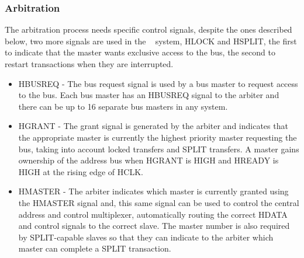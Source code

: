  
 \subsubsection{Arbitration}
 
 The arbitration process needs specific control signals, despite the ones described below, two more signals are used in the \amba~ system, HLOCK and HSPLIT,  the first to indicate that the master wants exclusive access to the bus, the second to restart transactions when they are interrupted.
 
 \begin{itemize}

\item  {HBUSREQ - } The bus request signal is used by a bus master to request access to the bus. Each bus master has an HBUSREQ signal to the arbiter and there can be up to 16 separate bus masters in any system.


\item  {HGRANT - } The grant signal is generated by the arbiter and indicates that the appropriate master is currently the highest priority master requesting the bus, taking into account locked transfers and SPLIT transfers. A master gains ownership of the address bus when HGRANT is HIGH and HREADY is HIGH at the rising edge of HCLK.

\item  {HMASTER - } The arbiter indicates which master is currently granted using the HMASTER signal and,  this same signal can be used to control the central address and control multiplexer, automatically routing the correct HDATA and control signals to the correct slave. The master number is also required by SPLIT-capable slaves so that they can indicate to the arbiter which master can complete a SPLIT transaction.


\end{itemize}

